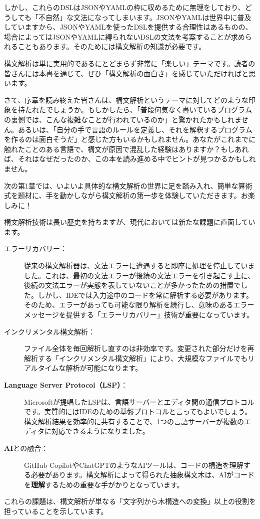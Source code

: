 しかし、これらのDSLはJSONやYAMLの枠に収めるために無理をしており、どうしても「不自然」な文法になってしまいます。JSONやYAMLは世界中に普及していますから、JSONやYAMLを使ったDSLを提供する合理性はあるものの、場合によってはJSONやYAMLに縛られないDSLの文法を考案することが求められることもあります。そのためには構文解析の知識が必要です。

構文解析は単に実用的であるにとどまらず非常に「楽しい」テーマです。読者の皆さんには本書を通じて、ぜひ「構文解析の面白さ」を感じていただければと思います。

さて、序章を読み終えた皆さんは、構文解析というテーマに対してどのような印象を持たれたでしょうか。もしかしたら、「普段何気なく書いているプログラムの裏側では、こんな複雑なことが行われているのか」と驚かれたかもしれません。あるいは、「自分の手で言語のルールを定義し、それを解釈するプログラムを作るのは面白そうだ」と感じた方もいるかもしれません。あなたがこれまでに触れたことのある言語で、構文が原因で混乱した経験はありますか？もしあれば、それはなぜだったのか、この本を読み進める中でヒントが見つかるかもしれません。

次の第1章では、いよいよ具体的な構文解析の世界に足を踏み入れ、簡単な算術式を題材に、手を動かしながら構文解析の第一歩を体験していただきます。お楽しみに！


\begin{tcolorbox}[
  enhanced,
  breakable,
  colback=lightgray!20,
  colframe=black,
  skin first=enhancedfirst,
  skin middle=enhancedmiddle,
  title=現代の構文解析の課題]
  構文解析技術は長い歴史を持ちますが、現代においては新たな課題に直面しています。

\begin{description}
  \item[エラーリカバリー：]
従来の構文解析器は、文法エラーに遭遇すると即座に処理を停止していました。これは、最初の文法エラーが後続の文法エラーを引き起こす上に、後続の文法エラーが実態を表していないことが多かったための措置でした。しかし、IDEでは入力途中のコードを常に解析する必要があります。そのため、エラーがあっても可能な限り解析を続行し、意味のあるエラーメッセージを提供する「エラーリカバリー」技術が重要になっています。
\item[インクリメンタル構文解析：]
ファイル全体を毎回解析し直すのは非効率です。変更された部分だけを再解析する「インクリメンタル構文解析」により、大規模なファイルでもリアルタイムな解析が可能になります。
\item[\textbf{\sffamily Language Server Protocol（LSP）}：]
Microsoftが提唱したLSPは、言語サーバーとエディタ間の通信プロトコルです。実質的にはIDEのための基盤プロトコルと言ってもよいでしょう。構文解析結果を効率的に共有することで、1つの言語サーバーが複数のエディタに対応できるようになりました。
\item[\textbf{\sffamily AI}との融合：]
GitHub CopilotやChatGPTのようなAIツールは、コードの構造を理解する必要があります。構文解析によって得られた抽象構文木は、AIがコードを\textbf{理解}するための重要な手がかりとなっています。
\end{description}

これらの課題は、構文解析が単なる「文字列から木構造への変換」以上の役割を担っていることを示しています。
\end{tcolorbox}
